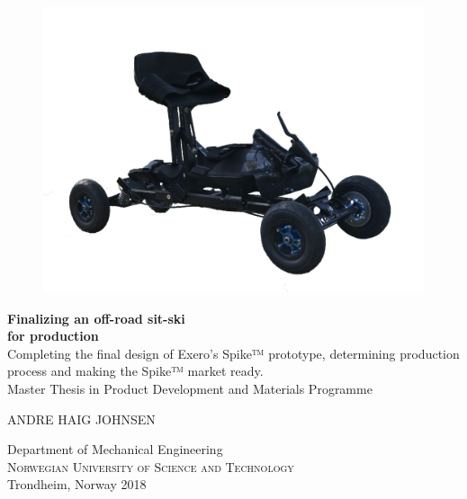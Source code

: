 \begin{titlepage}
		
\addtolength{\voffset}{2cm}

\begin{figure}[H]
\centering
\includegraphics[width=0.7\linewidth]{figures/title_page/spike.png}
\end{figure}

\mbox{}
\vfill
\renewcommand{\familydefault}{\sfdefault} \normalfont %
\textbf{{\Huge Finalizing an off-road sit-ski    \\[0.2cm]
				for production }} 	\\[0.5cm]
{\Large Completing the final design of Exero’s Spike™ prototype, determining production process and making the Spike™ market ready. }\\[0.5cm]
Master Thesis in Product Development and Materials Programme \setlength{\parskip}{1cm}

{\Large ANDRE HAIG JOHNSEN} \setlength{\parskip}{2.9cm}

Department of Mechanical Engineering \\
\textsc{Norwegian University of Science and Technology} \\
Trondheim, Norway 2018

\renewcommand{\familydefault}{\rmdefault} \normalfont %
\end{titlepage}


\newpage
\restoregeometry
\thispagestyle{empty}
\mbox{}


